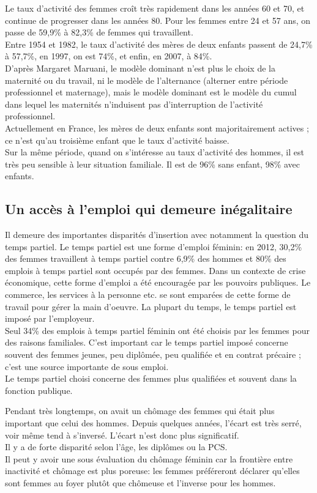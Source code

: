 \documentclass[10pt, a4paper, openany]{book}
\begin{document}
Le taux d'activité des femmes croît très rapidement dans les années 60 et 70, et continue de progresser dans les années 80. Pour les femmes entre 24 et 57 ans, on passe de 59,9\% à 82,3\% de femmes qui travaillent. \\
Entre 1954 et 1982, le taux d'activité des mères de deux enfants passent de 24,7\% à 57,7\%, en 1997, on est 74\%, et enfin, en 2007, à 84\%. \\
D'après Margaret Maruani, le modèle dominant n'est plus le choix de la maternité ou du travail, ni le modèle de l'alternance (alterner entre période professionnel et maternage), mais le modèle dominant est le modèle du cumul dans lequel les maternités n'induisent pas d'interruption de l'activité professionnel. \\
Actuellement en France, les mères de deux enfants sont majoritairement actives ; ce n'est qu'au troisième enfant que le taux d'activité baisse. \\
Sur la même période, quand on s'intéresse au taux d'activité des hommes, il est très peu sensible à leur situation familiale. Il est de 96\% sans enfant, 98\% avec enfants.  


\subsection{Un accès à l'emploi qui demeure inégalitaire}

Il demeure des importantes disparités d'insertion avec notamment la question du temps partiel. Le temps partiel est une forme d'emploi féminin: en 2012, 30,2\% des femmes travaillent à temps partiel contre 6,9\% des hommes et 80\% des emplois à temps partiel sont occupés par des femmes. Dans un contexte de crise économique, cette forme d'emploi a été encouragée par les pouvoirs publiques. Le commerce, les services à la personne etc. se sont emparées de cette forme de travail pour gérer la main d'oeuvre. La plupart du temps, le temps partiel est imposé par l'employeur. \\
Seul 34\% des emplois à temps partiel féminin ont été choisis par les femmes pour des raisons familiales. C'est important car le temps partiel imposé concerne souvent des femmes jeunes, peu diplômée, peu qualifiée et en contrat précaire ; c'est une source importante de sous emploi. \\
Le temps partiel choisi concerne des femmes plus qualifiées et souvent dans la fonction publique. 


Pendant très longtemps, on avait un chômage des femmes qui était plus important que celui des hommes. Depuis quelques années, l'écart est très serré, voir même tend à s'inversé. L'écart n'est donc plus significatif. \\
Il y a de forte disparité selon l'âge, les diplômes ou la PCS. \\
Il peut y avoir une sous évaluation du chômage féminin car la frontière entre inactivité et chômage est plus poreuse: les femmes préféreront déclarer qu'elles sont femmes au foyer plutôt que chômeuse et l'inverse pour les hommes. 
\end{document}
